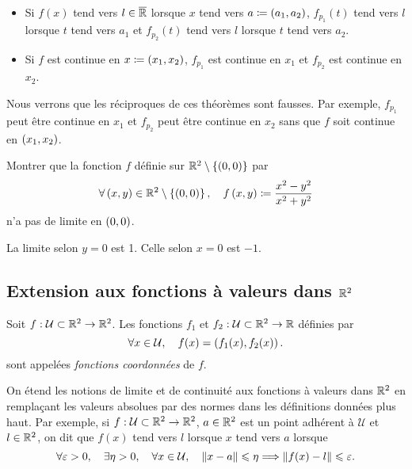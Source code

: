 \documentclass{magnolia}
\begin{document}
\begin{proposition}
\begin{itemize}
\item Si $f(x)$ tend vers $l\in\overline{\mathbb{R}}$ lorsque $x$ tend vers $a\coloneqq\left(a_1,a_2\right)$,
  $f_{p_1}(t)$ tend vers $l$ lorsque $t$ tend vers $a_1$ et $f_{p_2}(t)$
  tend vers $l$ lorsque $t$ tend vers $a_2$.
\item Si $f$ est continue en $x\coloneqq\left(x_1,x_2\right)$, $f_{p_1}$ est continue en $x_1$ et
  $f_{p_2}$ est continue en $x_2$.
\end{itemize}
\end{proposition}

\begin{remarqueUnique}
\remarque Nous verrons que les réciproques de ces théorèmes sont fausses. Par
  exemple, $f_{p_1}$ peut être continue en $x_1$ et $f_{p_2}$ peut être continue
  en $x_2$ sans que $f$ soit continue en $\left(x_1,x_2\right)$.
\end{remarqueUnique}

\begin{exoUnique}
\exo Montrer que la fonction $f$ définie sur $\mathbb{R}^2\setminus\left\{\left(0,0\right)\right\}$
  par
  \[\forall\left(x,y\right)\in\mathbb{R}^2\setminus\left\{\left(0,0\right)\right\} ,\quad
    f\left(x,y\right)\coloneqq\frac{x^2-y^2}{x^2+y^2}\]
  n'a pas de limite en $\left(0,0\right)$.
  \begin{sol}
  La limite selon $y=0$ est 1. Celle selon $x=0$ est $-1$.
  \end{sol}
\end{exoUnique}

\subsection{Extension aux fonctions à valeurs dans $\mathbb{R}^2$}

\begin{definition}
Soit $f:\mathcal{U}\subset\mathbb{R}^2\to\mathbb{R}^2$. Les fonctions $f_{1}$ et $f_{2}:\mathcal{U}\subset\mathbb{R}^2\to\mathbb{R}$ définies par
\[\forall x\in\mathcal{U} ,\quad f(x)=\left(f_{1}(x),f_{2}(x)\right).\]
sont appelées \emph{fonctions coordonnées} de $f$.
\end{definition}

\begin{remarqueUnique}
\remarque On étend les notions de limite et de continuité aux fonctions à valeurs dans $\mathbb{R}^2$ en remplaçant
  les valeurs absolues par des normes dans les définitions données plus haut.
  Par exemple, si $f:\mathcal{U}\subset\mathbb{R}^2\to\mathbb{R}^2$, $a\in\mathbb{R}^2$ est un
  point adhérent à $\mathcal{U}$ et $l\in\mathbb{R}^2$, on dit que $f(x)$ tend vers $l$ lorsque $x$ tend vers $a$
  lorsque
  \[\forall \varepsilon>0,\quad \exists \eta>0,\quad \forall x\in\mathcal{U},\quad
    \left\|x-a\right\|\leqslant\eta \Longrightarrow \left\|f(x)-l\right\|\leqslant\varepsilon.\]
\end{remarqueUnique}
\end{document}
